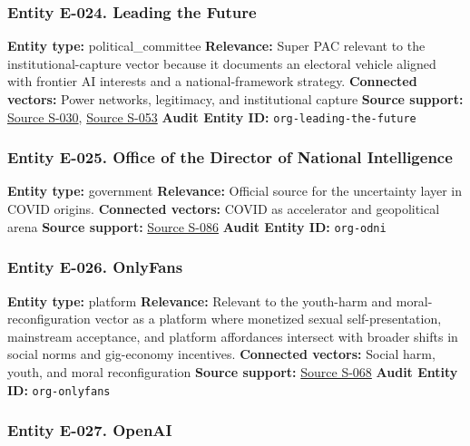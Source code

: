 \documentclass[
  american,
  11pt,
  letterpaper,
]{article}
\begin{document}
\subsubsection{Entity E-024. Leading the
Future}\label{entity-e-024-leading-the-future}

\textbf{Entity type:} political\_committee \textbf{Relevance:} Super PAC
relevant to the institutional-capture vector because it documents an
electoral vehicle aligned with frontier AI interests and a
national-framework strategy. \textbf{Connected vectors:} Power networks,
legitimacy, and institutional capture \textbf{Source support:}
\hyperref[source-s-030-openai-linked-pac-doubles-down-in-kentucky]{Source
S-030},
\hyperref[source-s-053-leading-the-future-committee-overview]{Source
S-053} \textbf{Audit Entity ID:} \texttt{org-leading-the-future}

\subsubsection{Entity E-025. Office of the Director of National
Intelligence}\label{entity-e-025-office-of-the-director-of-national-intelligence}

\textbf{Entity type:} government \textbf{Relevance:} Official source for
the uncertainty layer in COVID origins. \textbf{Connected vectors:}
COVID as accelerator and geopolitical arena \textbf{Source support:}
\hyperref[source-s-086-report-on-potential-links-between-the-wuhan-institute-of-virology-and-the-origins-of-covid-19]{Source
S-086} \textbf{Audit Entity ID:} \texttt{org-odni}

\subsubsection{Entity E-026. OnlyFans}\label{entity-e-026-onlyfans}

\textbf{Entity type:} platform \textbf{Relevance:} Relevant to the
youth-harm and moral-reconfiguration vector as a platform where
monetized sexual self-presentation, mainstream acceptance, and platform
affordances intersect with broader shifts in social norms and
gig-economy incentives. \textbf{Connected vectors:} Social harm, youth,
and moral reconfiguration \textbf{Source support:}
\hyperref[source-s-068-nudes-shouldn-t-i-charge-for-these-motivations-of-new-sexual-content-creators-on-onlyfans]{Source
S-068} \textbf{Audit Entity ID:} \texttt{org-onlyfans}

\subsubsection{Entity E-027. OpenAI}\label{entity-e-027-openai}
\end{document}
